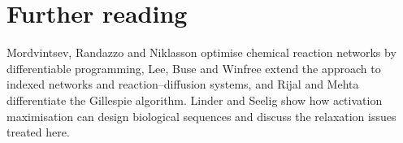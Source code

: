 \section*{Further reading}
Mordvintsev, Randazzo and Niklasson optimise chemical reaction networks by
differentiable programming,\cite{Mordvintsev2023} Lee, Buse and Winfree extend the
approach to indexed networks and reaction--diffusion systems,\cite{Lee2025} and
Rijal and Mehta differentiate the Gillespie algorithm.\cite{RijalMehta2025} Linder
and Seelig show how activation maximisation can design biological sequences and
discuss the relaxation issues treated here.\cite{LinderSeelig2021}
